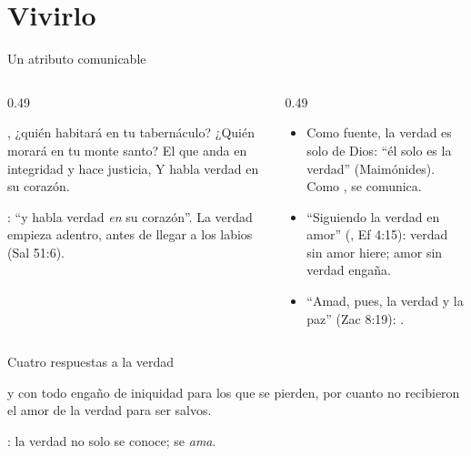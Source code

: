 \section{Vivirlo}

\begin{frame}{Un atributo comunicable}
\begin{columns}[t,onlytextwidth]
\begin{column}{0.49\textwidth}
\begin{cita}\SENOR{}, ¿quién habitará en tu tabernáculo? ¿Quién morará en tu monte santo? El que anda en integridad y hace justicia, Y habla verdad en su corazón.\end{cita}
\scriptsize{}: ``y habla verdad \emph{en} su corazón''. La verdad empieza adentro, antes de llegar a los labios (Sal 51:6).
\end{column}
\begin{column}{0.49\textwidth}\small
\begin{itemize}
\item Como fuente, la verdad es solo de Dios: ``él solo es la verdad'' (Maimónides). Como , se comunica.
\item ``Siguiendo la verdad en amor'' (, Ef 4:15): verdad sin amor hiere; amor sin verdad engaña.
\item ``Amad, pues, la verdad y la paz'' (Zac 8:19): .
\end{itemize}
\end{column}
\end{columns}
\end{frame}

\begin{frame}{Cuatro respuestas a la verdad}
\centering
{}\par\medskip
\begin{cita}y con todo engaño de iniquidad para los que se pierden, por cuanto no recibieron el amor de la verdad para ser salvos.\end{cita}
\scriptsize{}: la verdad no solo se conoce; se \emph{ama}.
\end{frame}

